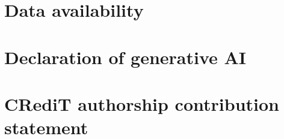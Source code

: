 \documentclass[a4paper,fleqn]{cas-dc}
\begin{document}
\section*{Data availability}
\section*{Declaration of generative AI}  %

\appendix

\section*{CRediT authorship contribution statement}  %


\end{document}
